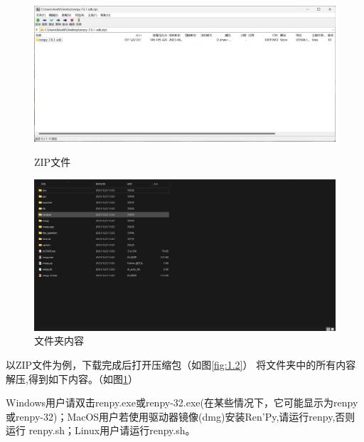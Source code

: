 \begin{figure}[htbp]
    \begin{minipage}{200pt}
        \centering
        \includegraphics[scale=.2]{Pictures/1/1.2/1.2.2.png}
        \caption{ZIP文件}
        \label{fig:1.2}
    \end{minipage}
    \begin{minipage}{180pt}
        \centering
        \includegraphics[scale=.15]{Pictures/1/1.2/1.2.3.png}
        \caption{文件夹内容}
        \label{fig:1.3}
    \end{minipage}
\end{figure}
以ZIP文件为例，下载完成后打开压缩包（如图\ref{fig:1.2}）
将文件夹中的所有内容解压,得到如下内容。（如图\ref{fig:1.3}）

Windows用户请双击renpy.exe或renpy-32.exe(在某些情况下，它可能显示为renpy或renpy-32)；MacOS用户若使用驱动器镜像(dmg)安装Ren'Py,请运行renpy,否则运行 renpy.sh；Linux用户请运行renpy.sh。

